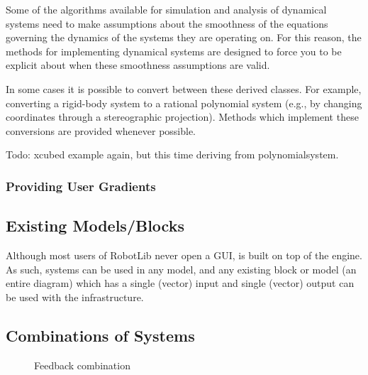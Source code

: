 Some of the algorithms available for simulation and
analysis of dynamical systems need to make assumptions about the
smoothness of the equations governing the dynamics of the systems they
are operating on.  For this reason, the methods for implementing
dynamical systems are designed to force you to be explicit about when
these smoothness assumptions are valid.  


In some cases it is possible to convert between these derived
classes.  For example, converting a rigid-body system to a rational
polynomial system (e.g., by changing coordinates through a
stereographic projection).  Methods which implement these conversions are
provided whenever possible.  

Todo: xcubed example again, but this time deriving from polynomialsystem.  


\subsubsection{Providing User Gradients}


\subsection{Existing \simulink Models/Blocks}\label{s:simulinksystem}

Although most users of RobotLib never open a \simulink GUI, \robotlib
is built on top of the \matlab \simulink engine.  As such, \robotlib
systems can be used in any \simulink model, and any existing \simulink
block or \simulink model (an entire \simulink diagram) which has a
single (vector) input and single (vector) output can be used with the
\robotlib infrastructure.  

\subsection{Combinations of Systems}

\begin{figure}[h]
\begin{center}
\end{center}
\caption{Feedback combination}
\end{figure}

